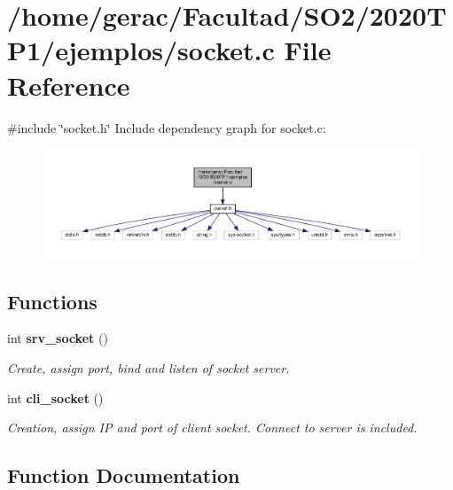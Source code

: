 \section{/home/gerac/\+Facultad/\+S\+O2/2020\+T\+P1/ejemplos/socket.c File Reference}
\label{socket_8c}
{\ttfamily \#include \char`\"{}socket.\+h\char`\"{}}\newline
Include dependency graph for socket.\+c\+:\nopagebreak
\begin{figure}[H]
\begin{center}
\leavevmode
\includegraphics[width=350pt]{socket_8c__incl}
\end{center}
\end{figure}
\subsection*{Functions}
\begin{DoxyCompactItemize}
\item 
int \textbf{ srv\+\_\+socket} ()
\begin{DoxyCompactList}\small\item\em Create, assign port, bind and listen of socket server. \end{DoxyCompactList}\item 
int \textbf{ cli\+\_\+socket} ()
\begin{DoxyCompactList}\small\item\em Creation, assign IP and port of client socket. Connect to server is included. \end{DoxyCompactList}\end{DoxyCompactItemize}


\subsection{Function Documentation}
\mbox{\label{socket_8c_a9c129efbce40f3061d7899d2adf36a55}} 
